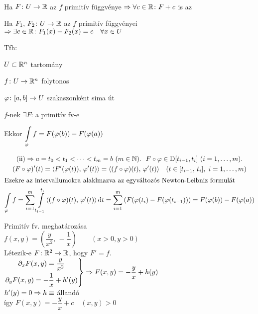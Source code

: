 \begin{te}\ 
  \begin{enumzjromai}
  \item Ha $F\colon U\to\mathbb{R}$ az $f$ primitív függvénye $\Rightarrow \forall c\in\mathbb{R}\colon F+c$ is az
  \item Ha $F_1,\,F_2\colon U\to\mathbb{R}$ az $f$ primitív függvényei $\Rightarrow \exists c\in\mathbb{R}\colon F_1(x)-F_2(x) = c \quad \forall
  x\in U$
  \end{enumzjromai}
\end{te}
\begin{te}
  Tfh:
\begin{enumzjromai}
  \item $U\subset \mathbb{R}^n$ tartomány
  \item $f\colon U\to \mathbb{R}^n$ folytonos
  \item $\varphi\colon [a,b]\to U$ szakaszonként sima út
  \item $f$-nek $\exists F$: a primitív fv-e
\end{enumzjromai}
Ekkor $\di\Int_\vfi f = F(\vfi(b))-F(\vfi(a))$
\end{te}
\begin{biz}
\begin{gather*}\text{(ii)}\nn a=t_0<t_1<\dotsb<t_m=b\ (m\in\N).\ \ F\circ\vfi\in\Der[t_{i-1},t_i]\ (i=1,\dotsc,m).\\
  (F\circ\vfi)'(t)=\skalar{F'(\vfi(t))}{\vfi'(t)}=\skalar{(f\circ\vfi)(t)}{\vfi'(t)}\quad(t\in[t_{i-1},\,t_i],\ 
  i=1,\dotsc,m)\\
  \intertext{Ezekre az intervallumokra alaklmazva az egyváltozós Newton-Leibniz formulát}
  \Int_\vfi f=\sum_{i=1}^m\Int_{t_{i-1}}^{t_i}\skalar{(f\circ\vfi)(t)}{\vfi'(t)}\diff t = \sum_{i=1}^m
  \left(F(\vfi(t_i)-F(\vfi(t_{i-1}))\right) = F(\vfi(b))-F(\vfi(a))
\end{gather*}
\end{biz}

\begin{pl}
  Primitív fv. meghatározása\\
  $f(x,y) = \left(\dfrac{y}{x^2},\,-\dfrac1x\right)\qquad(x>0,y>0)$\\
  Létezik-e $F\colon \mathbb{R}^2\to\mathbb{R}$, hogy $F'=f$.\\
  $\left.\!\begin{gathered}\partial_xF(x,y) = \dfrac{y}{x^2}\\\partial_yF(x,y)=-\dfrac1x+h'(y)\end{gathered}
  \right\}\Rightarrow F(x,y) = -\dfrac y x+h(y)$\\
  $h'(y) = 0\Rightarrow h\equiv$ állandó\\
  így $F(x,y) = -\dfrac y x +c\quad (x,y)>0$
\end{pl}

